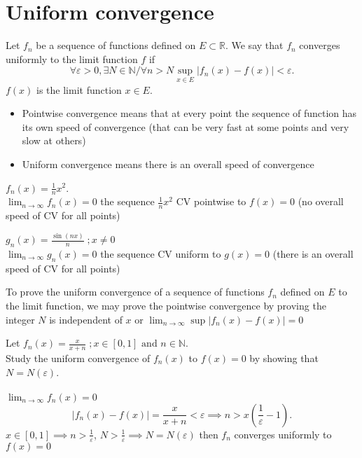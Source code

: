 \section{Uniform convergence}
\begin{definition}
    Let $f_n$ be a sequence of functions defined on $E\subset \mathbb{R}$. We say that $f_n$ converges uniformly to the limit function $f$ if 
    \[
    \forall \varepsilon>0,\exists N\in \mathbb{N}/\forall n>N \sup_{x\in E}\left|f_n(x)-f(x)\right|<\varepsilon
    .\] 
    $f(x)$ is the limit function $x\in E$.
\end{definition}
\begin{remark}
    \begin{itemize}
        \item Pointwise convergence means that at every point the sequence of function has its own speed of convergence (that can be very fast at some points and very slow at others)
        \item Uniform convergence means there is an overall speed of convergence
    \end{itemize}
\end{remark}
\begin{example}
     $f_n(x)=\frac{1}{n}x^2$.\\
     $\lim_{n \to \infty}f_n(x)=0$ the sequence $\frac{1}{n}x^2$ CV pointwise to $f(x)=0$ (no overall speed of CV for all points)
\end{example}
\begin{example}
    $g_n(x)=\frac{\sin(nx)}{n}\; ;x\neq 0$\\
   $\lim_{n \to \infty}g_n(x)=0 $ the sequence CV uniform to $g(x)=0$ (there is an overall speed of CV for all points)
\end{example}
\begin{remark}
   To prove the uniform convergence of a sequence of functions $f_n$ defined on $E$ to the limit function, we may prove the pointwise convergence by proving the integer $N$ is independent of $x$ or $\lim_{n \to \infty} \sup \left|f_n(x)-f(x)\right|=0$
\end{remark}

\begin{example}
    Let $f_n(x)=\frac{x}{x+n}\; ; x\in [0,1] \text{ and } n \in \mathbb{N}$.\\
    Study the uniform convergence of $f_n(x)$ to $f(x)=0$ by showing that $N=N(\varepsilon)$.\\\\
    $\lim_{n \to \infty}f_n(x)=0$
    \[
    \left| f_n(x)-f(x) \right| =\frac{x}{x+n}<\varepsilon \implies n>x\left( \frac{1}{\varepsilon}-1 \right) 
    .\] 
    $x\in[0,1]\implies n>\frac{1}{\varepsilon}$, $N>\frac{1}{\varepsilon}\implies N=N(\varepsilon)$ then $f_n$ converges uniformly to $f(x)=0$
\end{example}

